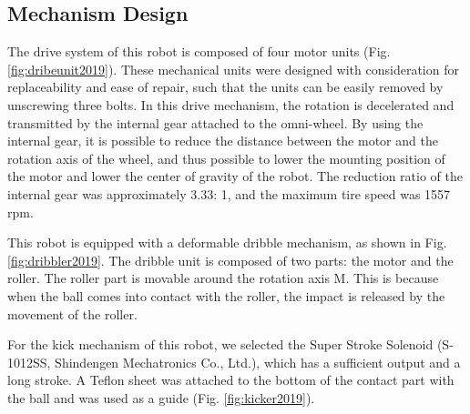 \documentclass[]{llncs}
\begin{document}
\subsection{Mechanism Design}
%
The drive system of this robot is composed of four motor units (Fig. \ref{fig:dribeunit2019}).
%
These mechanical units were designed with consideration for replaceability and ease of repair, such that the units can be easily removed by unscrewing three bolts.
%
In this drive mechanism, the rotation is decelerated and transmitted by the internal gear attached to the omni-wheel.
%
By using the internal gear, it is possible to reduce the distance between the motor and the rotation axis of the wheel, and thus possible to lower the mounting position of the motor and lower the center of gravity of the robot.
%
The reduction ratio of the internal gear was approximately 3.33: 1, and the maximum tire speed was 1557 rpm.
%

This robot is equipped with a deformable dribble mechanism, as shown in Fig. \ref{fig:dribbler2019}.
%
The dribble unit is composed of two parts: the motor and the roller.
%
The roller part is movable around the rotation axis M. This is because when the ball comes into contact with the roller, the impact is released by the movement of the roller.
%

For the kick mechanism of this robot, we selected the Super Stroke Solenoid (S-1012SS, Shindengen Mechatronics Co., Ltd.), which has a sufficient output and a long stroke.
%
A Teflon sheet was attached to the bottom of the contact part with the ball and was used as a guide (Fig. \ref{fig:kicker2019}).
\end{document}
